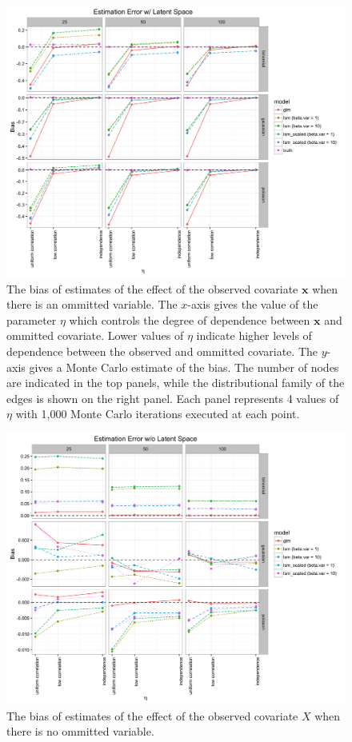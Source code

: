 \documentclass[11pt]{article}
\begin{document}
\begin{figure}
\includegraphics[width=\textwidth]{estimation_ls.png}
\caption{The bias of estimates of the effect of the observed covariate $\mathbf{x}$ when there is an ommitted variable. The $x$-axis gives the value of the parameter $\eta$ which controls the degree of dependence between $\mathbf{x}$ and ommitted covariate. Lower values of $\eta$ indicate higher levels of dependence between the observed and ommitted covariate. The $y$-axis gives a Monte Carlo estimate of the bias. The number of nodes are indicated in the top panels, while the distributional family of the edges is shown on the right panel. Each panel represents 4 values of $\eta$ with 1,000 Monte Carlo iterations executed at each point.
\label{fig:estimation_ls}}
\end{figure}

\begin{figure}
\includegraphics[width=\textwidth]{estimation_nls.png}
\caption{The bias of estimates of the effect of the observed covariate $X$ when there is no ommitted variable.
\label{fig:estimation_nls}}
\end{figure}
\end{document}
